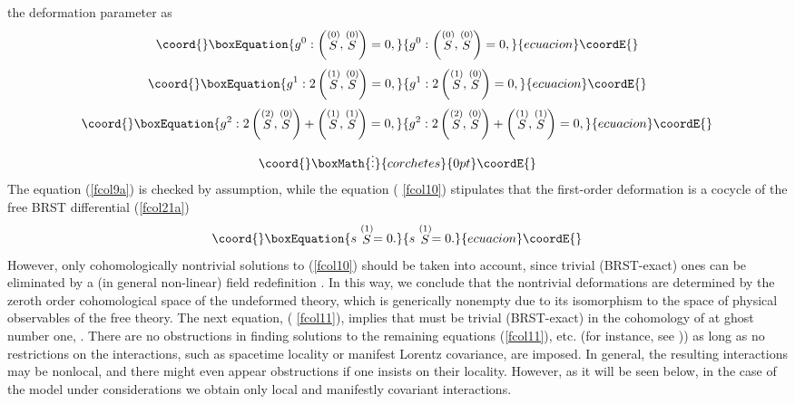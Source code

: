 \documentclass[a4paper,12pt]{article}
\begin{document}
the deformation parameter \coordHE{} as 
\begin{equation}\coord{}\boxEquation{
g^{0}:\left( \stackrel{(0)}{S},\stackrel{(0)}{S}\right) =0,  \label{fcol9a}
}{
g^{0}:\left( \stackrel{(0)}{S},\stackrel{(0)}{S}\right) =0,  }{ecuacion}\coordE{}\end{equation}
\begin{equation}\coord{}\boxEquation{
g^{1}:2\left( \stackrel{(1)}{S},\stackrel{(0)}{S}\right) =0,  \label{fcol10}
}{
g^{1}:2\left( \stackrel{(1)}{S},\stackrel{(0)}{S}\right) =0,  }{ecuacion}\coordE{}\end{equation}
\begin{equation}\coord{}\boxEquation{
g^{2}:2\left( \stackrel{(2)}{S},\stackrel{(0)}{S}\right) +\left( \stackrel{
(1)}{S},\stackrel{(1)}{S}\right) =0,  \label{fcol11}
}{
g^{2}:2\left( \stackrel{(2)}{S},\stackrel{(0)}{S}\right) +\left( \stackrel{
(1)}{S},\stackrel{(1)}{S}\right) =0,  }{ecuacion}\coordE{}\end{equation}
\[\coord{}\boxMath{
\vdots 
}{corchetes}{0pt}\coordE{}\]
The equation (\ref{fcol9a}) is checked by assumption, while the equation (%
\ref{fcol10}) stipulates that the first-order deformation is a cocycle of
the free BRST differential (\ref{fcol21a}) 
\begin{equation}\coord{}\boxEquation{
s\stackrel{(1)}{S}=0.  \label{fcol30}
}{
s\stackrel{(1)}{S}=0.  }{ecuacion}\coordE{}\end{equation}
However, only cohomologically nontrivial solutions to (\ref{fcol10}) should
be taken into account, since trivial (BRST-exact) ones can be eliminated by
a (in general non-linear) field redefinition \cite{21and5}. In this way, we
conclude that the nontrivial deformations \coordHE{} are determined
by the zeroth order cohomological space \coordHE{} of the
undeformed theory, which is generically nonempty due to its isomorphism to
the space of physical observables of the free theory. The next equation, (%
\ref{fcol11}), implies that \coordHE{} must be trivial (BRST-exact) in the cohomology of \coordHE{} at ghost
number one, \coordHE{}. There are no obstructions in finding
solutions to the remaining equations (\ref{fcol11}), etc. (for instance, see 
\cite{21and5})) as long as no restrictions on the interactions, such as
spacetime locality or manifest Lorentz covariance, are imposed. In general,
the resulting interactions may be nonlocal, and there might even appear
obstructions if one insists on their locality. However, as it will be seen
below, in the case of the model under considerations we obtain only local
and manifestly covariant interactions.
\end{document}

